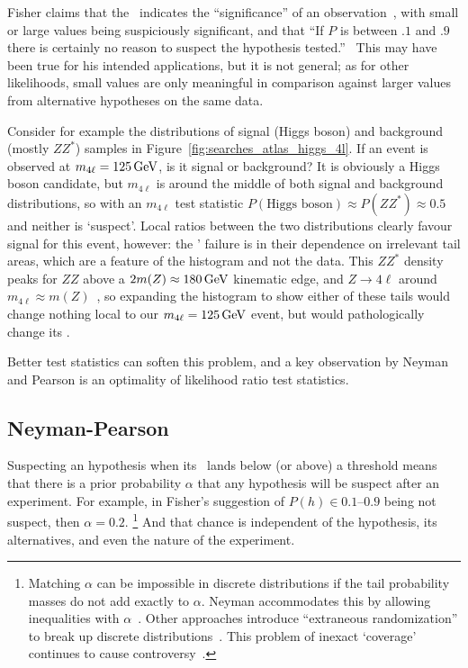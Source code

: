 Fisher claims that the \pvalue\ indicates the ``significance'' of an
observation~\cite{fisher1925smrw}, with small or large values being
suspiciously significant, and that
``If $P$ is between $.1$ and $.9$ there is certainly no reason to suspect the
hypothesis tested.''~\cite{fisher1925smrw}
This may have been true for his intended applications, but it is not general;
as for other likelihoods, small values are only meaningful in comparison
against larger values from alternative hypotheses on the same data.

Consider for example the distributions of signal (Higgs boson) and background
(mostly $ZZ^*$) samples in Figure~\ref{fig:searches_atlas_higgs_4l}.
If an event is observed at $m_{4\ell} = 125\,\eV[G]$, is it signal or
background?
It is obviously a Higgs boson candidate, but $m_{4\ell}$ is around the middle
of both signal and background distributions, so with an $m_{4\ell}$ test
statistic $P(\textrm{Higgs boson}) \approx P(ZZ^*) \approx 0.5$ and neither
is `suspect'.
Local ratios between the two distributions clearly favour signal for this
event, however:
the \pvalues' failure is in their dependence on irrelevant tail areas,
which are a feature of the histogram and not the data.
This $ZZ^*$ density peaks for $ZZ$ above a
$2 m(Z) \approx 180\,\eV[G]$ kinematic edge,
and $Z \to 4\ell$ around $m_{4\ell} \approx m(Z)$~\cite{STDM-2017-09},
so expanding the histogram to show either of these tails would change nothing
local to our $m_{4\ell} = 125\,\eV[G]$ event, but would pathologically change
its \pvalues.

Better test statistics can soften this problem, and a key observation by
Neyman and Pearson is an optimality of likelihood ratio test statistics.


\subsection{Neyman-Pearson}
\label{sec:searches_np}
Suspecting an hypothesis when its \pvalue\ lands below (or above) a threshold
means that there is a prior probability $\alpha$ that any hypothesis will be
suspect after an experiment.
For example, in Fisher's suggestion of $P(h) \in 0.1\textrm{--}0.9$ being not
suspect, then $\alpha = 0.2$.%
\footnote{%
Matching $\alpha$ can be impossible in discrete distributions if
the tail probability masses do not add exactly to $\alpha$.
Neyman accommodates this by allowing inequalities with $\alpha$~\cite{
neyman1935Intervals
}.
Other approaches introduce ``extraneous randomization'' to
break up discrete distributions~\cite{tocher1950discontinuous}.
This problem of inexact `coverage' continues to cause controversy~\cite{
Read2002cls,
Feldman:1997qc,
cousins2008evaluation,
Cranmer2006Statistical
}.%
}
And that chance is independent of the hypothesis, its alternatives, and even
the nature of the experiment.

